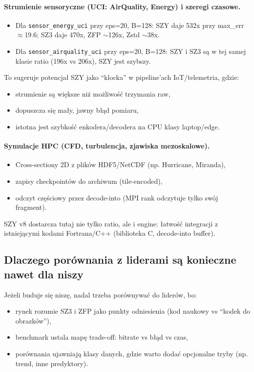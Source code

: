 \documentclass[11pt,a4paper]{article}
\begin{document}
\paragraph{Strumienie sensoryczne (UCI: AirQuality, Energy) i szeregi czasowe.}
\begin{itemize}
  \item Dla \texttt{sensor\_energy\_uci} przy eps=20, B=128: SZY daje 532x przy max\_err$\approx$19.6; SZ3 daje 470x, ZFP $\sim$126x, Zstd $\sim$38x.
  \item Dla \texttt{sensor\_airquality\_uci} przy eps=20, B=128: SZY i SZ3 są w tej samej klasie ratio (196x vs 206x), SZY jest szybszy.
\end{itemize}
To sugeruje potencjał SZY jako ``klocka'' w pipeline'ach IoT/telemetria, gdzie:
\begin{itemize}
  \item strumienie są większe niż możliwość trzymania raw,
  \item dopuszcza się mały, jawny błąd pomiaru,
  \item istotna jest szybkość enkodera/decodera na CPU klasy laptop/edge.
\end{itemize}

\paragraph{Symulacje HPC (CFD, turbulencja, zjawiska mezoskalowe).}
\begin{itemize}
  \item Cross-sectiony 2D z plików HDF5/NetCDF (np. Hurricane, Miranda),
  \item zapisy checkpointów do archiwum (tile-encoded),
  \item odczyt częściowy przez decode-into (MPI rank odczytuje tylko swój fragment).
\end{itemize}
SZY v8 dostarcza tutaj nie tylko ratio, ale i engine: łatwość integracji z istniejącymi kodami Fortrana/C++ (biblioteka C, decode-into buffer).

\subsection{Dlaczego porównania z liderami są konieczne nawet dla niszy}
Jeżeli buduje się niszę, nadal trzeba porównywać do liderów, bo:
\begin{itemize}
  \item rynek rozumie SZ3 i ZFP jako punkty odniesienia (kod naukowy vs ``kodek do obrazków''),
  \item benchmark ustala mapę trade-off: bitrate vs błąd vs czas,
  \item porównania ujawniają klasy danych, gdzie warto dodać opcjonalne tryby (np. trend, inne predyktory).
\end{itemize}
\end{document}
